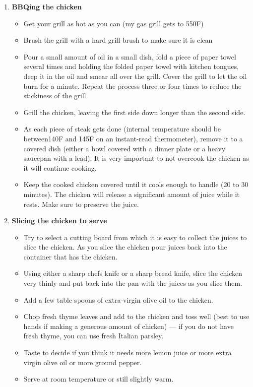 \documentclass[11pt,letterpaper]{article}
\begin{document}
\begin{description}
\begin{enumerate}
\begin{itemize}
	 	\end{itemize}
	\item {\bf BBQing the chicken}
	\begin{itemize}
	\item Get your grill as hot as you can (my gas grill gets to 550F)
	 \item Brush the grill with a hard grill brush to make sure it is clean
	 \item Pour a small amount of oil in a small dish, fold a piece of paper towel several times and holding the folded paper towel with kitchen tongues, deep it in the oil and smear all over the grill. Cover the grill to let the oil burn for a minute. Repeat the process three or four times to reduce the stickiness of the grill. 
	\item Grill the chicken, leaving the first side down longer than the second side.
	 \item As each piece of steak gets done (internal temperature should be between140F and 145F on an instant-read thermometer), remove it to a covered dish (either a bowl covered with a dinner plate or a heavy saucepan with a lead). It is very important to not overcook the chicken as it will continue cooking.
	 \item Keep the cooked chicken covered until it cools enough to handle (20 to 30 minutes). The chicken will release a significant amount of juice while it rests. Make sure to preserve the juice.
	\end{itemize}
	\item {\bf Slicing the chicken to serve}
	\begin{itemize}
        		\item Try to select a cutting board from which it is easy to collect the juices to slice the chicken. As you slice the chicken pour juices back into the container that has the chicken.
		\item Using either a sharp chefs knife or a sharp bread knife, slice the chicken very thinly and put back into the pan with the juices as you slice them.
		\item Add a few table spoons of extra-virgin olive oil to the chicken.
		\item Chop fresh thyme leaves and  add to the chicken and toss well (best to use hands if making a generous amount of chicken) --- if you do not have fresh thyme, you can use fresh Italian parsley.
		\item Taste to decide if you think it needs more lemon juice or more extra virgin olive oil or more ground pepper.
		\item Serve at room temperature or still slightly warm.
	\end{itemize}
     	\end{enumerate}         
\end{description}
\end{document}
